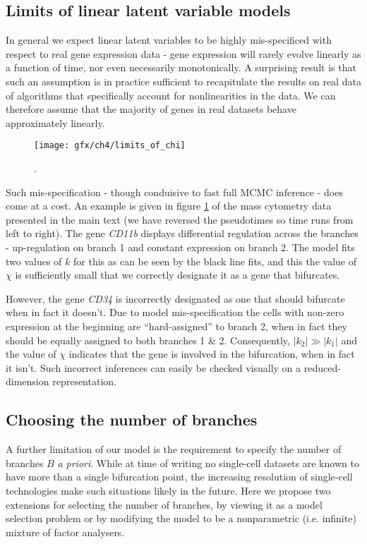 \subsection{Limits of linear latent variable models}

In general we expect linear latent variables to be highly mis-specificed with respect to real gene expression data - gene expression will rarely evolve linearly as a function of time, nor even necessarily monotonically. A surprising result is that such an assumption is in practice sufficient to recapitulate the results on real data of algorithms that specifically account for nonlinearities in the data. We can therefore assume that the majority of genes in real datasets behave approximately linearly.

\begin{figure}
	\centering
	\texttt{[image: gfx/ch4/limits\_of\_chi]}
	\caption{.} \label{fig:chi}
\end{figure}

Such mis-specification - though conduisive to fast full MCMC inference - does come at a cost. An example is given in figure \ref{fig:chi} of the mass cytometry data presented in the main text (we have reversed the pseudotimes so time runs from left to right). The gene \emph{CD11b} displays differential regulation across the branches - up-regulation on branch 1 and constant expression on branch 2. The model fits two values of $k$ for this as can be seen by the black line fits, and this the value of $\chi$ is sufficiently small that we correctly designate it as a gene that bifurcates.

However, the gene \emph{CD34} is incorrectly designated as one that should bifurcate when in fact it doesn't. Due to model mis-specification the cells with non-zero expression at the beginning are ``hard-assigned'' to branch 2, when in fact they should be equally assigned to both branches 1 \& 2. Consequently, $|k_2| \gg |k_1|$ and the value of $\chi$ indicates that the gene is involved in the bifurcation, when in fact it isn't. Such incorrect inferences can easily be checked visually on a reduced-dimension representation.

\subsection{Choosing the number of branches}

A further limitation of our model is the requirement to specify the number of branches $B$ \emph{a priori}. While at time of writing no single-cell datasets are known to have more than a single bifurcation point, the increasing resolution of single-cell technologies make such situations likely in the future. Here we propose two extensions for selecting the number of branches, by viewing it as a model selection problem or by modifying the model to be a nonparametric (i.e. infinite) mixture of factor analysers.

